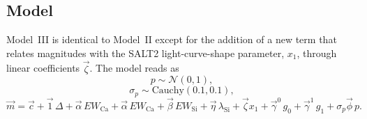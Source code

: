 \documentclass[trackchanges]{aastex62}   	%
\begin{document}
\subsection{Model}
\label{modelIImodel:sec}
Model~III is identical to Model~II except for the 
addition of a new term  that relates magnitudes with the SALT2 light-curve-shape parameter,
$x_1$, through linear coefficients $\vec{\zeta}$. 
The model reads as
\begin{equation}
p  \sim \mathcal{N}(0,1 ),
\end{equation}
\begin{equation}
\sigma_p  \sim \text{Cauchy}(0.1,0.1),
\end{equation}
{\begin{equation}
\vec{m}=
 \vec{c} +  \vec{1} \, \Delta + \vec{\alpha} \, EW_{\mathrm{Ca}}+
\vec{\alpha} \,  EW_{\mathrm{Ca}}+
\vec{\beta}  \, EW_{\mathrm{Si}} +
\vec{\eta}  \, \lambda_{\mathrm{Si}} +
\vec{\zeta} x_1 +
\vec{\gamma}^0  \,  g_0 +
\vec{\gamma}^1  \,  g_1 +
\sigma_p \vec{\phi}\,p.
\label{ewsiv3:eqn}
\end{equation}
}
\end{document}
